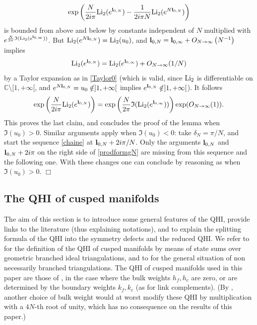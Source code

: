 \documentclass[11pt]{amsart}
\newcommand{\cvd}{\hfill$\Box$}
\newcommand{\mc}{\mathbb{C}}
\newcommand{\bl}{{\bf l}}
\def\cvd{\hfill$\Box$}
\begin{document}
{\begin{equation}\label{ratiojuil25}
\exp\left( \frac{N}{2i\pi}{\rm Li_2}(e^{\bl_{0,N}})- \frac{1}{2i\pi N}{\rm Li_2}(e^{N\bl_{0,N}})
\right)
\end{equation}
is bounded from above and below by constants independent of $N$ multiplied with $e^{\frac{N}{2\pi} \mathfrak{I}({\rm Li_2}(e^{\bl_{0,\infty}}))}$. But ${\rm Li_2}(e^{N\bl_{0,N}})={\rm Li_2}(u_0)$, and $\bl_{0,N} = \bl_{0,\infty} + O_{N \to \infty}\left (N^{-1}\right )$ implies
$$ {\rm Li_2}(e^{\bl_{0,N}}) ={\rm Li_2}(e^{\bl_{0,\infty}})+O_{N \to \infty}(1/N)$$
by a Taylor expansion as in \eqref{Taylor0} (which is valid, since ${\rm Li_2}$ is differentiable on $\mc \setminus [1,+\infty[$, and $e^{N\bl_{0,N}}=u_0\notin ]1,+\infty[$ implies $e^{\bl_{0,N}} \notin ]1,+\infty[$). It follows
$$\exp\left( \frac{N}{2i\pi}{\rm Li_2}(e^{\bl_{0,N}})\right )= \exp\left(\frac{N}{2\pi} \mathfrak{I}({\rm Li_2}(e^{\bl_{0,\infty}}))\right)\exp (O_{N \to \infty}(1)).$$
This proves the last claim, and concludes the proof of the lemma when $\Im(u_0) > 0$. Similar arguments apply when $\Im(u_0) < 0$: take $\delta_N=\pi/N$, and start the sequence \eqref{chaine} at $\bl_{0,N}+ 2i\pi/N$. Only the arguments $\bl_{0,N}$ and $\bl_{0,N} + 2i\pi$ on the right side of \eqref{prodformgN} are missing from this sequence and the following one. With these changes one can conclude by reasoning as when $\Im(u_0) > 0$. \cvd

\subsection{The QHI of cusped manifolds}\label{sec:QHIcusped} The aim of this section is to introduce some general features of the QHI, provide links to the literature (thus explaining notations), and to explain the splitting formula of the QHI into the symmetry defects and the reduced QHI. We refer to \cite{GT} for the definition of the QHI of cusped manifolds by means of state sums over geometric branched ideal triangulations, and to \cite{AGT} for the general situation of non necessarily branched triangulations. The QHI of cusped manifolds used in this paper are those of \cite[Theorem 1.1]{AGT}, in the case where the bulk weights $h_f,h_c$ are zero, or are determined by the boundary weights $k_f,k_c$ (as for link complements). (By \cite[Corollary 1.8 (1)]{NA}, another choice of bulk weight would at worst modify these QHI by multiplication with a $4N$-th root of unity, which has no consequence on the results of this paper.)

}
\end{document}
